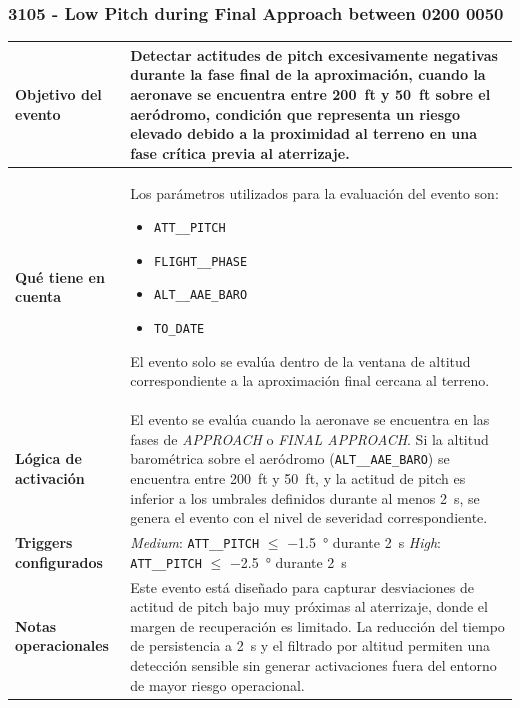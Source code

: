 \documentclass[11pt,a4paper]{article}
\begin{document}
	\subsubsection{3105 - Low Pitch during Final Approach between 0200 0050}
	
	\begin{longtable}{p{5cm} p{9.5cm}}
		\hline
		\textbf{Objetivo del evento} &
		Detectar actitudes de pitch excesivamente negativas durante la fase final de la aproximación, cuando la aeronave se encuentra entre \SI{200}{ft} y \SI{50}{ft} sobre el aeródromo, condición que representa un riesgo elevado debido a la proximidad al terreno en una fase crítica previa al aterrizaje. \\
		\hline
		
		\textbf{Qué tiene en cuenta} &
		Los parámetros utilizados para la evaluación del evento son:
		\begin{itemize}
			\item \texttt{ATT\_\_PITCH}
			\item \texttt{FLIGHT\_\_PHASE}
			\item \texttt{ALT\_\_AAE\_BARO}
			\item \texttt{TO\_DATE}
		\end{itemize}
		El evento solo se evalúa dentro de la ventana de altitud correspondiente a la aproximación final cercana al terreno. \\
		\hline
		
		\textbf{Lógica de activación} &
		El evento se evalúa cuando la aeronave se encuentra en las fases de \textit{APPROACH} o \textit{FINAL APPROACH}.  
		Si la altitud barométrica sobre el aeródromo (\texttt{ALT\_\_AAE\_BARO}) se encuentra entre \SI{200}{ft} y \SI{50}{ft}, y la actitud de pitch es inferior a los umbrales definidos durante al menos \SI{2}{s}, se genera el evento con el nivel de severidad correspondiente. \\
		\hline
		
		\textbf{Triggers configurados} &
		\textit{Medium}: \texttt{ATT\_\_PITCH} $\leq$ \SI{-1.5}{\degree} durante \SI{2}{s} \newline
		\textit{High}: \texttt{ATT\_\_PITCH} $\leq$ \SI{-2.5}{\degree} durante \SI{2}{s} \\
		\hline
		
		\textbf{Notas operacionales} &
		Este evento está diseñado para capturar desviaciones de actitud de pitch bajo muy próximas al aterrizaje, donde el margen de recuperación es limitado.  
		La reducción del tiempo de persistencia a \SI{2}{s} y el filtrado por altitud permiten una detección sensible sin generar activaciones fuera del entorno de mayor riesgo operacional. \\
		\hline
	\end{longtable} \newpage
	
\end{document}
